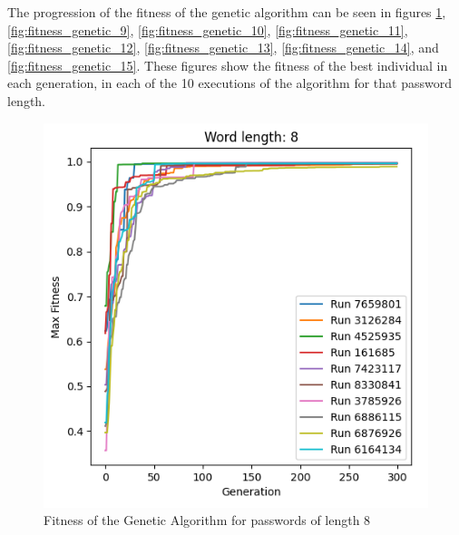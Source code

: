 \documentclass[sigconf,authordraft]{acmart}
\begin{document}
The progression of the fitness of the genetic algorithm can be seen in figures \ref{fig:fitness_genetic_8}, \ref{fig:fitness_genetic_9}, \ref{fig:fitness_genetic_10}, \ref{fig:fitness_genetic_11}, \ref{fig:fitness_genetic_12}, \ref{fig:fitness_genetic_13}, \ref{fig:fitness_genetic_14}, and \ref{fig:fitness_genetic_15}.
These figures show the fitness of the best individual in each generation, in each of the 10 executions of the algorithm for that password length.

\begin{figure}
  \includegraphics[width=\columnwidth]{genetic_results_8.png}
  \caption{Fitness of the Genetic Algorithm for passwords of length 8}
  \label{fig:fitness_genetic_8}
\end{figure}
\end{document}
